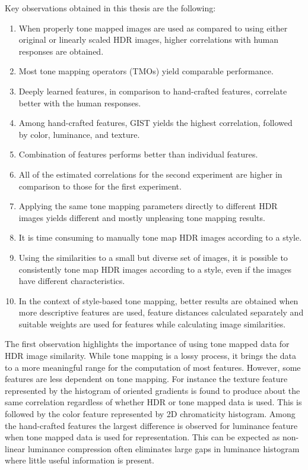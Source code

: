 Key observations obtained in this thesis are the following:
%
\begin{enumerate}
\item When properly tone mapped images are used as compared to using either original or linearly scaled HDR images, higher correlations with human responses are obtained.
\item Most tone mapping operators (TMOs) yield comparable performance.
\item Deeply learned features, in comparison to hand-crafted features, correlate better with the human responses.
\item Among hand-crafted features, GIST yields the highest correlation, followed by color, luminance, and texture.
\item Combination of features performs better than individual features.
\item All of the estimated correlations for the second experiment are higher in comparison to those for the first experiment.
\item Applying the same tone mapping parameters directly to different HDR images yields different and mostly unpleasing tone mapping results.
\item It is time consuming to manually tone map HDR images according to a style.
\item Using the similarities to a small but diverse set of images, it is possible to consistently tone map HDR images according to a style, even if the images have different characteristics.
\item In the context of style-based tone mapping, better results are obtained when more descriptive features are used, feature distances calculated separately and suitable weights are used for features while calculating image similarities.
\end{enumerate}

The first observation highlights the importance of using tone mapped data for HDR image similarity. While tone mapping is a lossy process, it brings the data to a more meaningful range for the computation of most features. However, some features are less dependent on tone mapping. For instance the texture feature represented by the histogram of oriented gradients is found to produce about the same correlation regardless of whether HDR or tone mapped data is used. This is followed by the color feature represented by 2D chromaticity histogram. Among the hand-crafted features the largest difference is  observed for luminance feature when tone mapped data is used for representation. This can be expected as non-linear luminance compression often eliminates large gaps in luminance histogram where little useful information is present.

